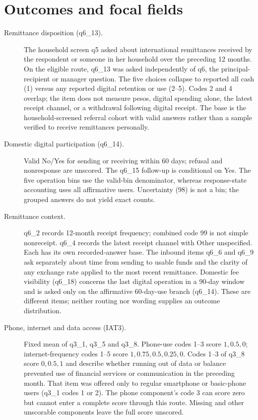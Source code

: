 \section{Outcomes and focal fields}
\begin{description}
\item[Remittance disposition (q6\_13).] The household screen q5 asked about international remittances received by the respondent or someone in her household over the preceding 12 months. On the eligible route, q6\_13 was asked independently of q6, the principal-recipient or manager question. The five choices collapse to reported all cash (1) versus any reported digital retention or use (2--5). Codes 2 and 4 overlap; the item does not measure pesos, digital spending alone, the latest receipt channel, or a withdrawal following digital receipt. The base is the household-screened referral cohort with valid answers rather than a sample verified to receive remittances personally.
\item[Domestic digital participation (q6\_14).] Valid No/Yes for sending or receiving within 60 days; refusal and nonresponse are unscored. The q6\_15 follow-up is conditional on Yes. The five operation bins use the valid-bin denominator, whereas response-state accounting uses all affirmative users. Uncertainty (98) is not a bin; the grouped answers do not yield exact counts.
\item[Remittance context.] q6\_2 records 12-month receipt frequency; combined code 99 is not simple nonreceipt. q6\_4 records the latest receipt channel with Other unspecified. Each has its own recorded-answer base. The inbound items q6\_6 and q6\_9 ask separately about time from sending to usable funds and the clarity of any exchange rate applied to the most recent remittance. Domestic fee visibility (q6\_18) concerns the last digital operation in a 90-day window and is asked only on the affirmative 60-day-use branch (q6\_14). These are different items; neither routing nor wording supplies an outcome distribution.
\item[Phone, internet and data access (IAT3).] Fixed mean of q3\_1, q3\_5 and q3\_8. Phone-use codes 1--3 score $1,0.5,0$; internet-frequency codes 1--5 score $1,0.75,0.5,0.25,0$. Codes 1--3 of q3\_8 score $0,0.5,1$ and describe whether running out of data or balance prevented use of financial services or communication in the preceding month. That item was offered only to regular smartphone or basic-phone users (q3\_1 codes 1 or 2). The phone component's code 3 can score zero but cannot enter a complete score through this route. Missing and other unscorable components leave the full score unscored.

\end{description}
